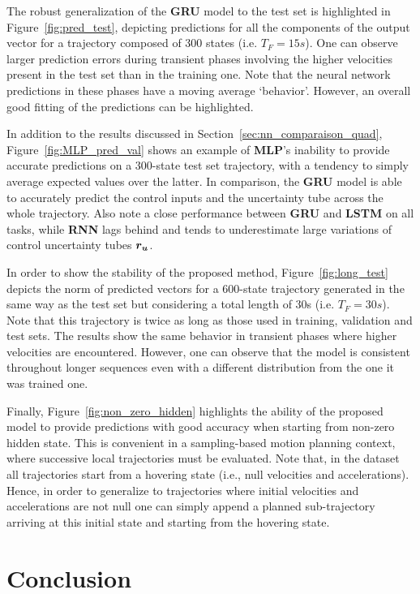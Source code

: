 The robust generalization of the \textbf{GRU} model to the test set is highlighted in Figure~\ref{fig:pred_test}, depicting predictions for all the components of the output vector for a trajectory composed of 300 states (i.e. $T_F=15s$).
One can observe larger prediction errors during transient phases involving the higher velocities present in the test set than in the training one.
Note that the neural network predictions in these phases have a moving average `behavior'. 
However, an overall good fitting of the predictions can be highlighted.

In addition to the results discussed in Section~\ref{sec:nn_comparaison_quad}, Figure~\ref{fig:MLP_pred_val} shows an example of \textbf{MLP}'s inability to provide accurate predictions on a 300-state test set trajectory, with a tendency to simply average expected values over the latter.
In comparison, the \textbf{GRU} model is able to accurately predict the control inputs and the uncertainty tube across the whole trajectory. 
Also note a close performance between \textbf{GRU} and \textbf{LSTM} on all tasks, while \textbf{RNN} lags behind and tends to underestimate large variations of control uncertainty tubes $\boldsymbol{r_u}$.

In order to show the stability of the proposed method, Figure~\ref{fig:long_test} depicts the norm of predicted vectors for a 600-state trajectory generated in the same way as the test set but considering a total length of 30s (i.e. $T_F=30s$).
Note that this trajectory is twice as long as those used in training, validation and test sets.
The results show the same behavior in transient phases where higher velocities are encountered.
However, one can observe that the model is consistent throughout longer sequences even with a different distribution from the one it was trained one. 

Finally, Figure~\ref{fig:non_zero_hidden} highlights the ability of the proposed model to provide predictions with good accuracy when starting from non-zero hidden state. 
This is convenient in a sampling-based motion planning context, where successive local trajectories must be evaluated.
Note that, in the dataset all trajectories start from a hovering state (i.e., null velocities and accelerations). 
Hence, in order to generalize to trajectories where initial velocities and accelerations are not null one can simply append a planned sub-trajectory arriving at this initial state and starting from the hovering state.

\section{Conclusion} \label{sec:NN_concl}


